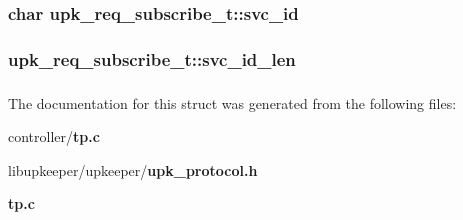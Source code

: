 \subsubsection[{svc\_\-id}]{\setlength{\rightskip}{0pt plus 5cm}char {\bf upk\_\-req\_\-subscribe\_\-t::svc\_\-id}}\label{structupk__req__subscribe__t_a5307d4368a648364277ef8415cddc3bb}
\subsubsection[{svc\_\-id\_\-len}]{ {\bf upk\_\-req\_\-subscribe\_\-t::svc\_\-id\_\-len}}\label{structupk__req__subscribe__t_a8a7d9dd5b4318109dd45b960a0f9ffe3}
\subsubsection[{UPK\_\-V0\_\-REQ\_\-SUBSCR\_\-T\_\-FIELDS}]{}\label{structupk__req__subscribe__t_a750774bdb4b4f21e3229dc5ecf6ccadd}


The documentation for this struct was generated from the following files:\begin{DoxyCompactItemize}
\item 
controller/{\bf tp.c}\item 
libupkeeper/upkeeper/{\bf upk\_\-protocol.h}\item 
{\bf tp.c}\end{DoxyCompactItemize}
